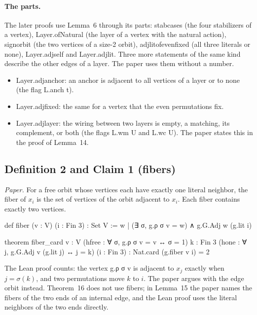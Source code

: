 \documentclass[11pt,a4paper]{article}
\newcommand{\leanus}{\textunderscore\allowbreak}
\newcommand{\lean}[1]{{\ttfamily\let\_\leanus #1}}
\begin{document}
\paragraph{The parts.} The later proofs use Lemma~6 through its parts:
\lean{stab\_cases} (the four stabilizers of a vertex),
\lean{Layer.ofNatural} (the layer of a vertex with the natural action),
\lean{sign\_orbit} (the two vertices of a size-2 orbit),
\lean{adj\_lit\_of\_even\_fixed} (all three literals or none),
\lean{Layer.adj\_self} and \lean{Layer.adj\_lit}. Three more statements of
the same kind describe the other edges of a layer. The paper uses them
without a number.
\begin{itemize}
\item \lean{Layer.adj\_anchor}: an anchor is adjacent to all vertices of a
layer or to none (the flag \lean{L.anch t}).
\item \lean{Layer.adj\_fixed}: the same for a vertex that the even
permutations fix.
\item \lean{Layer.adj\_layer}: the wiring between two layers is empty, a
matching, its complement, or both (the flags \lean{L.wm U} and
\lean{L.wc U}). The paper states this in the proof of Lemma~14.
\end{itemize}

\subsection{Definition 2 and Claim 1 (fibers)}
\emph{Paper.} For a free orbit whose vertices each have exactly one literal
neighbor, the fiber of $x_i$ is the set of vertices of the orbit adjacent to
$x_i$. Each fiber contains exactly two vertices.
\begin{code}
def fiber (v : V) (i : Fin 3) : Set V :=
  {w | (∃ σ, g.ρ σ v = w) ∧ g.G.Adj w (g.lit i)}

theorem fiber_card {v : V} (hfree : ∀ σ, g.ρ σ v = v ↔ σ = 1) {k : Fin 3}
    (hone : ∀ j, g.G.Adj v (g.lit j) ↔ j = k) (i : Fin 3) : Nat.card (g.fiber v i) = 2
\end{code}
The Lean proof counts: the vertex \lean{g.ρ σ v} is adjacent to $x_j$
exactly when $j=\sigma(k)$, and two permutations move $k$ to $i$. The paper
argues with the edge orbit instead. Theorem~16 does not use fibers; in
Lemma~15 the paper names the fibers of the two ends of an internal edge, and
the Lean proof uses the literal neighbors of the two ends directly.
\end{document}
